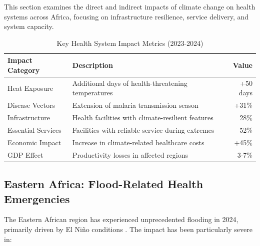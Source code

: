 This section examines the direct and indirect impacts of climate change on health systems across Africa, focusing on infrastructure resilience, service delivery, and system capacity.

\begin{table}[ht]
\footnotesize
\caption{Key Health System Impact Metrics (2023-2024)}
\label{tab:health_impacts}
\begin{tabularx}{\columnwidth}{@{}lXr@{}}
\toprule
\textbf{Impact Category} & \textbf{Description} & \textbf{Value} \\
\midrule
Heat Exposure & Additional days of health-threatening temperatures & +50 days \\
Disease Vectors & Extension of malaria transmission season & +31\% \\
Infrastructure & Health facilities with climate-resilient features & 28\% \\
Essential Services & Facilities with reliable service during extremes & 52\% \\
Economic Impact & Increase in climate-related healthcare costs & +45\% \\
GDP Effect & Productivity losses in affected regions & 3-7\% \\
\bottomrule
\end{tabularx}
\end{table}

\subsection{Eastern Africa: Flood-Related Health Emergencies}

The Eastern African region has experienced unprecedented flooding in 2024, primarily driven by El Niño conditions \citep{unocha2024east}. The impact has been particularly severe in:

